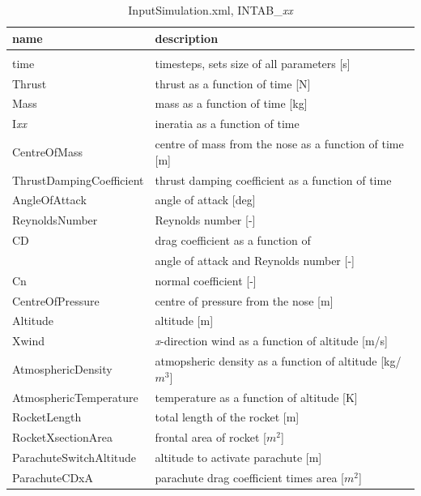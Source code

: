 \documentclass[11pt, a4paper]{article}
\begin{document}
\begin{table}
  \centering
  \caption{InputSimulation.xml, INTAB\_\emph{xx}}
  \label{tab:input_simulation_xml_1}
  \begin{tabular}{l p{8cm}}
    \textbf{name} & \textbf{description} \\
    \hline \\
    time & timesteps, sets size of all parameters [s] \\
    Thrust & thrust as a function of time [N] \\
    Mass & mass as a function of time [kg] \\
    I\emph{xx} & ineratia as a function of time \\
    CentreOfMass & centre of mass from the nose as a function of time [m] \\
    ThrustDampingCoefficient & thrust damping coefficient as a function of time \\
    AngleOfAttack & angle of attack [deg] \\
    ReynoldsNumber & Reynolds number [-] \\
    CD & drag coefficient as a function of  \\
     & angle of attack and Reynolds number [-] \\
    Cn & normal coefficient [-] \\
    CentreOfPressure & centre of pressure from the nose [m] \\
    Altitude & altitude [m] \\
    Xwind & \emph{x}-direction wind as a function of altitude [m/s] \\
    AtmosphericDensity & atmopsheric density as a function of altitude [kg/$m^3$] \\
    AtmosphericTemperature & temperature as a function of altitude [K] \\
    RocketLength & total length of the rocket [m] \\
    RocketXsectionArea & frontal area of rocket [$m^2$] \\
    ParachuteSwitchAltitude & altitude to activate parachute [m] \\
    ParachuteCDxA & parachute drag coefficient times area [$m^2$] \\
  \end{tabular}
\end{table}
\end{document}
